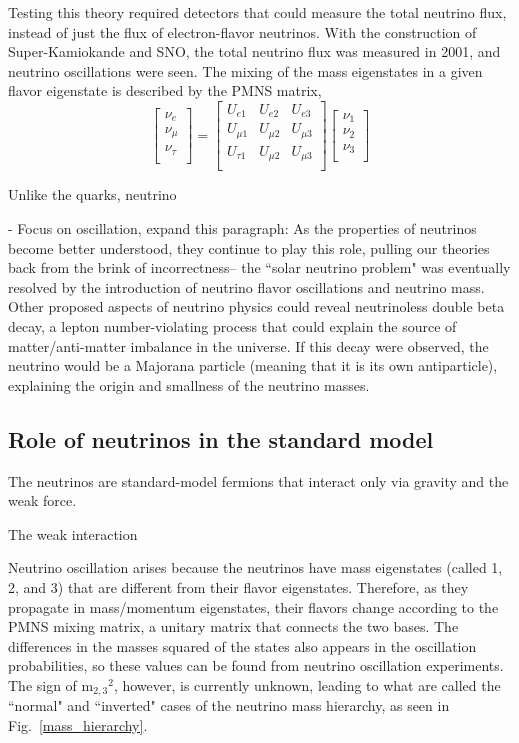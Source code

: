 Testing this theory required detectors that could measure the total neutrino flux, instead of just the flux of electron-flavor neutrinos. With the construction of Super-Kamiokande and SNO, the total neutrino flux was measured in 2001, and neutrino oscillations were seen. The mixing of the mass eigenstates in a given flavor eigenstate is described by the PMNS matrix, 
\[
\begin{bmatrix}
\nu_e\\
\nu_\mu\\
\nu_\tau\\
\end{bmatrix}
=
\begin{bmatrix}
U_{e1} & U_{e2} & U_{e3} \\ 
U_{\mu1} & U_{\mu2} & U_{\mu3} \\ 
U_{\tau1} & U_{\mu2} & U_{\mu3} \\ 
\end{bmatrix}
\begin{bmatrix}
\nu_1\\
\nu_2\\
\nu_3\\
\end{bmatrix}
\]

Unlike the quarks, neutrino

- Focus on oscillation, expand this paragraph:
As the properties of neutrinos become better understood, they continue to play this role, pulling our theories back from the brink of incorrectness-- the ``solar neutrino problem" was eventually resolved by the introduction of neutrino flavor oscillations and neutrino mass. \cite{PDG2014} Other proposed aspects of neutrino physics could reveal neutrinoless double beta decay, a lepton number-violating process that could explain the source of matter/anti-matter imbalance in the universe. If this decay were observed, the neutrino would be a Majorana particle (meaning that it is its own antiparticle), explaining the origin and smallness of the neutrino masses.

\subsection{Role of neutrinos in the standard model} 
The neutrinos are standard-model fermions that interact only via gravity and the weak force. 

The weak interaction 


Neutrino oscillation arises because the neutrinos have mass eigenstates (called 1, 2, and 3) that are different from their flavor eigenstates. Therefore, as they propagate in mass/momentum eigenstates, their flavors change according to the PMNS mixing matrix, a unitary matrix that connects the two bases.  The differences in the masses squared of the states also appears in the oscillation probabilities, so these values can be found from neutrino oscillation experiments. The sign of m$_{2,3}$$^{2}$, however, is currently unknown, leading to what are called the ``normal" and ``inverted" cases of the neutrino mass hierarchy, as seen in Fig.~\ref{mass_hierarchy}. 

